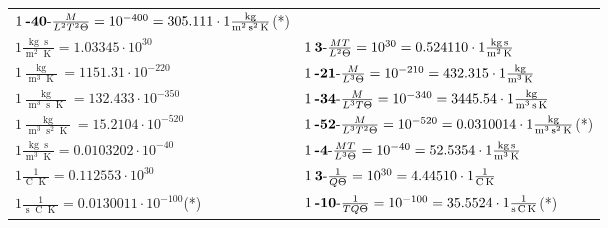 \begin{center}
\begin{longtable}{l l}
	{\color{black}$1\:\text{\textbf{-40}-} \frac{M}{L^2T^2\Theta}=10^{-400} = 305.111 \cdot 1 \bm{\mathrm{ }}\frac{\operatorname{kg}}{\operatorname{m}^2\operatorname{s}^2\operatorname{K}}$}\quad(*)\\
{\color{black}$1 \bm{\mathrm{ }}\frac{\operatorname{kg}\operatorname{s}}{\operatorname{m}^2\operatorname{K}} = 1.03345\cdot10^{30} $}&
	{\color{black}$1\:\text{\textbf{3}-} \frac{MT}{L^2\Theta}=10^{30} = 0.524110 \cdot 1 \bm{\mathrm{ }}\frac{\operatorname{kg}\operatorname{s}}{\operatorname{m}^2\operatorname{K}}$}\\
{\color{black}$1 \bm{\mathrm{ }}\frac{\operatorname{kg}}{\operatorname{m}^3\operatorname{K}} = 1151.31\cdot10^{-220} $}&
	{\color{black}$1\:\text{\textbf{-21}-} \frac{M}{L^3\Theta}=10^{-210} = 432.315 \cdot 1 \bm{\mathrm{ }}\frac{\operatorname{kg}}{\operatorname{m}^3\operatorname{K}}$}\\
{\color{black}$1 \bm{\mathrm{ }}\frac{\operatorname{kg}}{\operatorname{m}^3\operatorname{s}\operatorname{K}} = 132.433\cdot10^{-350} $}&
	{\color{black}$1\:\text{\textbf{-34}-} \frac{M}{L^3T\Theta}=10^{-340} = 3445.54 \cdot 1 \bm{\mathrm{ }}\frac{\operatorname{kg}}{\operatorname{m}^3\operatorname{s}\operatorname{K}}$}\\
{\color{black}$1 \bm{\mathrm{ }}\frac{\operatorname{kg}}{\operatorname{m}^3\operatorname{s}^2\operatorname{K}} = 15.2104\cdot10^{-520} $}&
	{\color{black}$1\:\text{\textbf{-52}-} \frac{M}{L^3T^2\Theta}=10^{-520} = 0.0310014 \cdot 1 \bm{\mathrm{ }}\frac{\operatorname{kg}}{\operatorname{m}^3\operatorname{s}^2\operatorname{K}}$}\quad(*)\\
{\color{black}$1 \bm{\mathrm{ }}\frac{\operatorname{kg}\operatorname{s}}{\operatorname{m}^3\operatorname{K}} = 0.0103202\cdot10^{-40} $}&
	{\color{black}$1\:\text{\textbf{-4}-} \frac{MT}{L^3\Theta}=10^{-40} = 52.5354 \cdot 1 \bm{\mathrm{ }}\frac{\operatorname{kg}\operatorname{s}}{\operatorname{m}^3\operatorname{K}}$}\\
\hline{\color{black}$1 \bm{\mathrm{ }}\frac1{\operatorname{C}\operatorname{K}} = 0.112553\cdot10^{30} $}&
	{\color{black}$1\:\text{\textbf{3}-} \frac1{Q\Theta}=10^{30} = 4.44510 \cdot 1 \bm{\mathrm{ }}\frac1{\operatorname{C}\operatorname{K}}$}\\
{\color{black}$1 \bm{\mathrm{ }}\frac1{\operatorname{s}\operatorname{C}\operatorname{K}} = 0.0130011\cdot10^{-100} $}\quad(*)&
	{\color{black}$1\:\text{\textbf{-10}-} \frac1{TQ\Theta}=10^{-100} = 35.5524 \cdot 1 \bm{\mathrm{ }}\frac1{\operatorname{s}\operatorname{C}\operatorname{K}}$}\quad(*)\\

\end{longtable}
\end{center}
